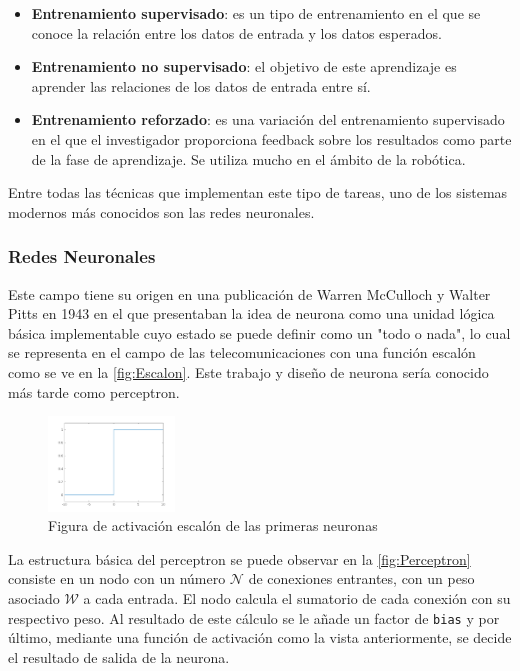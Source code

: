 \begin{itemize}
    \item \textbf{Entrenamiento supervisado}: es un tipo de entrenamiento en el que se conoce la relación entre los datos de entrada y los datos esperados. 
    \item \textbf{Entrenamiento no supervisado}: el objetivo de este aprendizaje es aprender las relaciones de los datos de entrada entre sí.
    \item \textbf{Entrenamiento reforzado}: es una variación del entrenamiento supervisado en el que el investigador proporciona feedback sobre los resultados como parte de la fase de aprendizaje. Se utiliza 
    mucho en el ámbito de la robótica.
\end{itemize}

Entre todas las técnicas que implementan este tipo de tareas, uno de los sistemas modernos más conocidos son las redes neuronales.

\subsubsection{Redes Neuronales}

Este campo tiene su origen en una publicación de Warren McCulloch y Walter Pitts en 1943\cite{mccullochLOGICALCALCULUSIDEAS} en el que presentaban la idea de neurona como una unidad lógica básica 
implementable cuyo estado se puede definir como un "todo o nada", lo cual se representa en el campo de las telecomunicaciones con una función escalón como se ve en la \autoref{fig:Escalon}. Este 
trabajo y diseño de neurona sería conocido más tarde como perceptron.

\begin{figure}[H]
    \centering
    \includegraphics[width=0.3\textwidth]{images/4/Escalon.png}
    \caption{Figura de activación escalón de las primeras neuronas}
    \label{fig:Escalon}
\end{figure}

La estructura básica del perceptron se puede observar en la \autoref{fig:Perceptron} consiste en un nodo con un número \(\mathcal{N}\) de conexiones entrantes, con un peso asociado \(\mathcal{W}\) 
a cada entrada. El nodo calcula el sumatorio de cada conexión con su respectivo peso. Al resultado de este cálculo se le añade un factor de \texttt{bias} y por último, mediante una función de 
activación como la vista anteriormente, se decide el resultado de salida de la neurona. 


